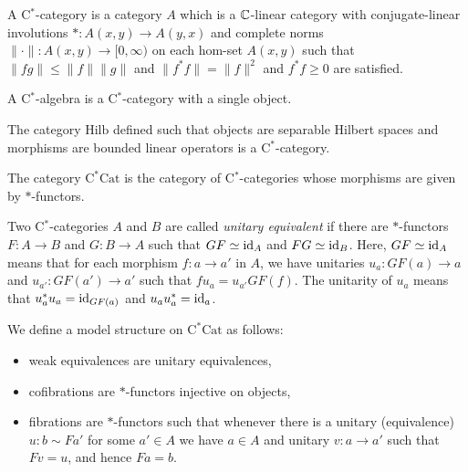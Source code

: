 \documentclass{../../../small}
\begin{document}
\begin{definition*}[C$^*$-category]
A C$^*$-category is a category $A$ which is a $\mathbb{C}$-linear category with conjugate-linear involutions $*:A(x,y)\to A(y,x)$ and complete norms $\|\cdot\|:A(x,y)\to[0,\infty)$ on each hom-set $A(x,y)$ such that $\|fg\|\le\|f\|\|g\|$ and $\|f^*f\|=\|f\|^2$ and $f^*f\ge0$ are satisfied.
\end{definition*}
\begin{example*}
A C$^*$-algebra is a C$^*$-category with a single object.
\end{example*}
\begin{example*}
The category $\mathrm{Hilb}$ defined such that objects are separable Hilbert spaces and morphisms are bounded linear operators is a C$^*$-category. 
\end{example*}
\begin{definition*}
The category $\mathrm{C^*Cat}$ is the category of C$^*$-categories whose morphisms are given by $*$-functors.
\end{definition*}

\begin{definition*}
Two C$^*$-categories $A$ and $B$ are called \emph{unitary equivalent} if there are $*$-functors $F:A\to B$ and $G:B\to A$ such that $GF\simeq\operatorname{id}_A$ and $FG\simeq\operatorname{id}_B$.
Here, $GF\simeq\operatorname{id}_A$ means that for each morphism $f:a\to a'$ in $A$, we have unitaries $u_a:GF(a)\to a$ and $u_{a'}:GF(a')\to a'$ such that $fu_a=u_{a'}GF(f)$.
The unitarity of $u_a$ means that $u_a^*u_a=\operatorname{id}_{GF(a)}$ and $u_au_a^*=\operatorname{id}_a$.
\end{definition*}
\begin{definition*}
We define a model structure on $\mathrm{C^*Cat}$ as follows:
\begin{itemize}
\item weak equivalences are unitary equivalences,
\item cofibrations are $*$-functors injective on objects,
\item fibrations are $*$-functors such that whenever there is a unitary (equivalence) $u:b\sim Fa'$ for some $a'\in A$ we have $a\in A$ and unitary $v:a\to a'$ such that $Fv=u$, and hence $Fa=b$.
\end{itemize}
\end{definition*}
\end{document}
